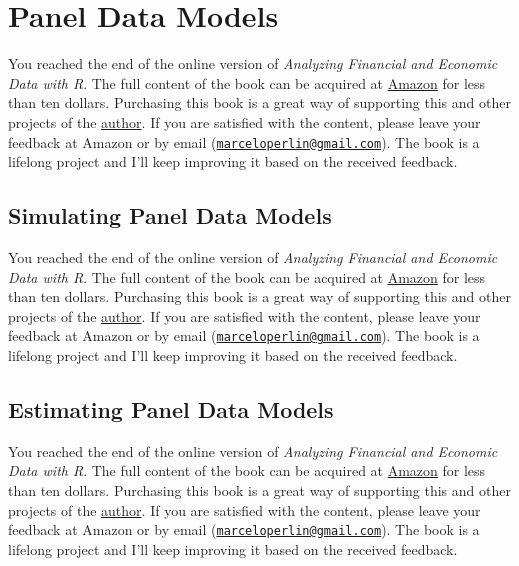 \documentclass[
  12pt,
]{book}
\newenvironment{pleasebuyit}
{\begin{noteblock}
		
	} {\end{noteblock}}
\begin{document}
\hypertarget{panel-data-models}{%
\section{Panel Data Models}\label{panel-data-models}}

\begin{pleasebuyit}
You reached the end of the online version of \emph{Analyzing Financial
and Economic Data with R}. The full content of the book can be acquired
at \href{https://www.amazon.com/dp/B084LSNXMN}{Amazon} for less than ten
dollars. Purchasing this book is a great way of supporting this and
other projects of the \href{https://www.msperlin.com/blog/}{author}. If
you are satisfied with the content, please leave your feedback at Amazon
or by email
(\href{mailto:marceloperlin@gmail.com}{\nolinkurl{marceloperlin@gmail.com}}).
The book is a lifelong project and I'll keep improving it based on the
received feedback.
\end{pleasebuyit}

\hypertarget{simulating-panel-data-models}{%
\subsection{Simulating Panel Data Models}\label{simulating-panel-data-models}}

\begin{pleasebuyit}
You reached the end of the online version of \emph{Analyzing Financial
and Economic Data with R}. The full content of the book can be acquired
at \href{https://www.amazon.com/dp/B084LSNXMN}{Amazon} for less than ten
dollars. Purchasing this book is a great way of supporting this and
other projects of the \href{https://www.msperlin.com/blog/}{author}. If
you are satisfied with the content, please leave your feedback at Amazon
or by email
(\href{mailto:marceloperlin@gmail.com}{\nolinkurl{marceloperlin@gmail.com}}).
The book is a lifelong project and I'll keep improving it based on the
received feedback.
\end{pleasebuyit}

\hypertarget{estimating-panel-data-models}{%
\subsection{Estimating Panel Data Models}\label{estimating-panel-data-models}}

\begin{pleasebuyit}
You reached the end of the online version of \emph{Analyzing Financial
and Economic Data with R}. The full content of the book can be acquired
at \href{https://www.amazon.com/dp/B084LSNXMN}{Amazon} for less than ten
dollars. Purchasing this book is a great way of supporting this and
other projects of the \href{https://www.msperlin.com/blog/}{author}. If
you are satisfied with the content, please leave your feedback at Amazon
or by email
(\href{mailto:marceloperlin@gmail.com}{\nolinkurl{marceloperlin@gmail.com}}).
The book is a lifelong project and I'll keep improving it based on the
received feedback.
\end{pleasebuyit}
\end{document}
